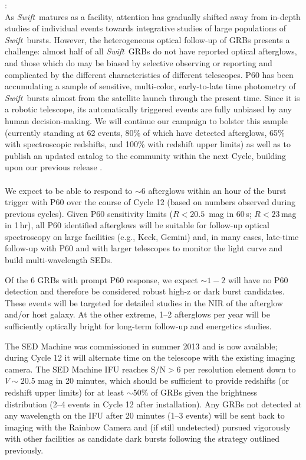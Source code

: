 \documentclass[letterpaper,11pt]{article}
\newcommand{\swift}{\textit{Swift}}
\begin{document}
\noindent {\it D) Population Statistics for \swift\ GRBs}:
\smallskip\\
As \swift\ matures as a facility, attention has gradually shifted away from in-depth 
studies of individual events towards integrative studies of large populations of 
\swift\ bursts.  However, the heterogeneous optical follow-up of GRBs presents a challenge: 
almost half of all \swift\ GRBs do not have reported optical afterglows, and those which do 
may be biased by selective observing or reporting and complicated by the different characteristics of different telescopes.  
P60 has been accumulating a sample of sensitive, multi-color, early-to-late time 
photometry of \swift\ bursts almost from the satellite launch through the present time.
Since it is a robotic telescope, its automatically triggered events are fully unbiased by
any human decision-making.  We will continue our campaign to bolster this sample
(currently standing at 62 events, 80\% of which have detected afterglows, 65\% with
spectroscopic redshifts, and 100\% with redshift upper limits) as well as to publish an 
updated catalog to the community within the next Cycle, building upon our previous 
release \citep{ckh+09,pcb+09}. \\

\smallskip\\
We expect to be able to respond to $\sim 6$ afterglows within an hour of the burst
trigger with P60 over the course of Cycle 12 (based on numbers observed during 
previous cycles).  Given P60 sensitivity limits ($R < 20.5$\, mag in 60\,s; 
$R < 23$\,mag in 1\,hr), all P60 identified afterglows will be suitable for 
follow-up optical spectroscopy on large facilities (e.g., Keck, Gemini) and, in 
many cases, late-time follow-up with P60 and with larger telescopes to monitor 
the light curve and build multi-wavelength SEDs.  

Of the 6 GRBs with prompt P60 response, we expect $\sim 1-2$ will have
no P60 detection and therefore be considered robust high-z or dark 
burst candidates.  These events will be targeted for detailed studies
in the NIR of the afterglow and/or host galaxy.  At the other extreme, 1--2 
afterglows per year will be sufficiently optically bright for long-term 
follow-up and energetics studies.

The SED Machine was commissioned in summer 2013 and is now available; 
during Cycle 12 it will alternate time on the telescope with the existing 
imaging camera.  The SED Machine IFU
reaches S/N$>$6 per resolution element down to $V \sim 20.5$ mag in 20 minutes,
which should be sufficient to provide redshifts (or redshift upper limits) 
for at least $\sim$50\% of GRBs given the brightness distribution 
(2--4 events in Cycle 12 after installation).  Any GRBs not detected at any 
wavelength on the IFU after 20 minutes (1--3 events) will be sent back to 
imaging with the Rainbow Camera and (if still undetected) pursued vigorously 
with other facilities as candidate dark bursts following the strategy outlined 
previously.
\end{document}
